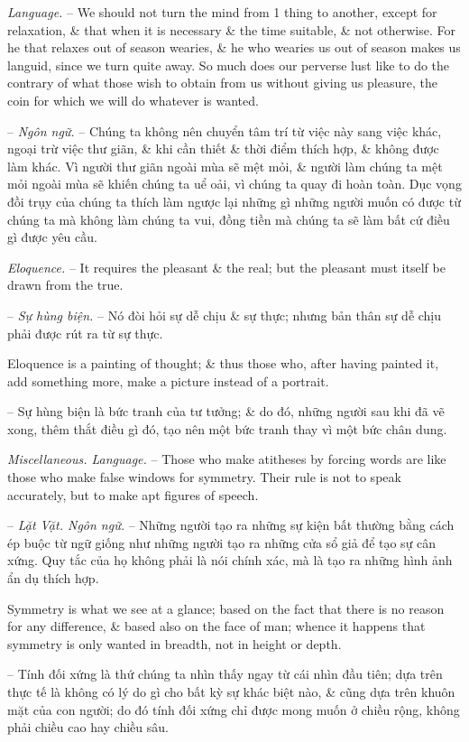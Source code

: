 \documentclass{article}
\begin{document}
\begin{enumerate}
\begin{itemize}
		 {\it Language.} -- We should not turn the mind from 1 thing to another, except for relaxation, \& that when it is necessary \& the time suitable, \& not otherwise. For he that relaxes out of season wearies, \& he who wearies us out of season makes us languid, since we turn quite away. So much does our perverse lust like to do the contrary of what those wish to obtain from us without giving us pleasure, the coin for which we will do whatever is wanted.
		
		-- {\it Ngôn ngữ.} -- Chúng ta không nên chuyển tâm trí từ việc này sang việc khác, ngoại trừ việc thư giãn, \& khi cần thiết \& thời điểm thích hợp, \& không được làm khác. Vì người thư giãn ngoài mùa sẽ mệt mỏi, \& người làm chúng ta mệt mỏi ngoài mùa sẽ khiến chúng ta uể oải, vì chúng ta quay đi hoàn toàn. Dục vọng đồi trụy của chúng ta thích làm ngược lại những gì những người muốn có được từ chúng ta mà không làm chúng ta vui, đồng tiền mà chúng ta sẽ làm bất cứ điều gì được yêu cầu.
		
		 {\it Eloquence.} -- It requires the pleasant \& the real; but the pleasant must itself be drawn from the true.
		
		-- {\it Sự hùng biện.} -- Nó đòi hỏi sự dễ chịu \& sự thực; nhưng bản thân sự dễ chịu phải được rút ra từ sự thực.
		
		 Eloquence is a painting of thought; \& thus those who, after having painted it, add something more, make a picture instead of a portrait.
		
		-- Sự hùng biện là bức tranh của tư tưởng; \& do đó, những người sau khi đã vẽ xong, thêm thắt điều gì đó, tạo nên một bức tranh thay vì một bức chân dung.
		
		 {\it Miscellaneous. Language.} -- Those who make atitheses by forcing words are like those who make false windows for symmetry. Their rule is not to speak accurately, but to make apt figures of speech.
		
		-- {\it Lặt Vặt. Ngôn ngữ.} -- Những người tạo ra những sự kiện bất thường bằng cách ép buộc từ ngữ giống như những người tạo ra những cửa sổ giả để tạo sự cân xứng. Quy tắc của họ không phải là nói chính xác, mà là tạo ra những hình ảnh ẩn dụ thích hợp.
		
		 Symmetry is what we see at a glance; based on the fact that there is no reason for any difference, \& based also on the face of man; whence it happens that symmetry is only wanted in breadth, not in height or depth.
		
		-- Tính đối xứng là thứ chúng ta nhìn thấy ngay từ cái nhìn đầu tiên; dựa trên thực tế là không có lý do gì cho bất kỳ sự khác biệt nào, \& cũng dựa trên khuôn mặt của con người; do đó tính đối xứng chỉ được mong muốn ở chiều rộng, không phải chiều cao hay chiều sâu.
		

\end{itemize}
\end{enumerate}
\end{document}
